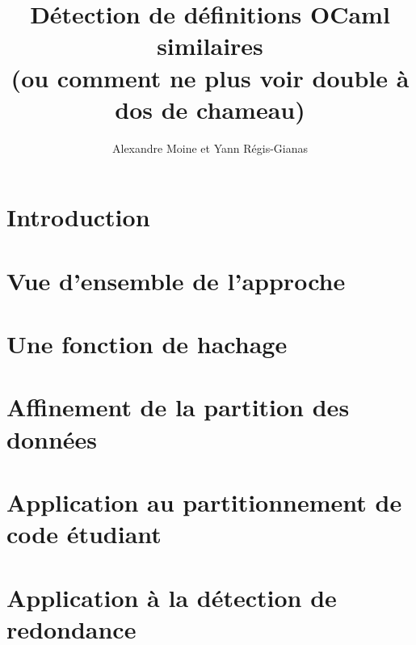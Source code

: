 \documentclass[a4paper]{easychair}
\title{Détection de définitions OCaml similaires \\
(ou comment ne plus voir double à dos de chameau)}
\author{Alexandre Moine et Yann Régis-Gianas}
\institute{Université de Paris}
\begin{document}
\maketitle

\begin{abstract}

\end{abstract}

\section{Introduction}


\section{Vue d'ensemble de l'approche}
\label{sec:overview}



\section{Une fonction de hachage}
\label{sec:hash}


\section{Affinement de la partition des données}


\section{Application au partitionnement de code étudiant}
\label{sec:partition}


\section{Application à la détection de redondance}
\label{sec:redundancy}



\end{document}
